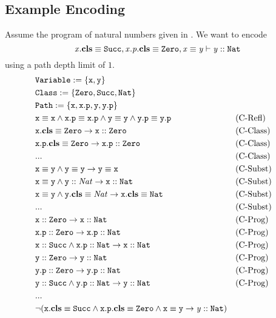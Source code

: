 \documentclass[a4paper]{article}
\begin{document}
\newpage
%
\subsection{Example Encoding}
Assume the program of natural numbers given in .
We want to encode
\[ \mathit{x}.\textbf{cls} \equiv \mathit{\mathtt{Succ}}, \mathit{x.p}.\textbf{cls} \equiv \mathit{\mathtt{Zero}}, \mathit{x} \equiv \mathit{y} \vdash \mathit{y} :: \mathit{\mathtt{Nat}} \]
using a path depth limit of $1$.
\setcounter{equation}{0}
\begin{align}
  &\texttt{\ensuremath{\mathtt{Variable}}} := \{\mathtt{x}, \mathtt{y}\}\\
  &\texttt{\ensuremath{\mathtt{Class}}} := \{\mathtt{Zero},\mathtt{Succ},\mathtt{Nat}\}\\
  &\texttt{\ensuremath{\mathtt{Path}}} := \{\mathtt{x}, \mathtt{x.p}, \mathtt{y}, \mathtt{y.p}\}\\
  &\mathit{\mathtt{x}} \equiv \mathit{\mathtt{x}} \land
  \mathit{\mathtt{x.p}} \equiv \mathit{\mathtt{x.p}} \land
  \mathit{\mathtt{y}} \equiv \mathit{\mathtt{y}} \land
  \mathit{\mathtt{y.p}} \equiv \mathit{\mathtt{y.p}} && \text{(C-Refl)}\\
  &\mathit{\mathtt{x}}.\textbf{cls} \equiv \mathit{\mathtt{Zero}} \rightarrow \mathit{\mathtt{x}} :: \mathit{\mathtt{Zero}} && \text{(C-Class)}\\
  &\mathit{\mathtt{x.p}}.\textbf{cls} \equiv \mathit{\mathtt{Zero}} \rightarrow \mathit{\mathtt{x.p}} :: \mathit{\mathtt{Zero}} && \text{(C-Class)}\\
  & ...  && \text{(C-Class)}\\
  & \mathit{\mathtt{x}} \equiv \mathit{\mathtt{y}} \land \mathit{\mathtt{y}} \equiv \mathit{\mathtt{y}} \rightarrow \mathit{\mathtt{y}} \equiv \mathit{\mathtt{x}} && \text{(C-Subst)}\\
  & \mathit{\mathtt{x}} \equiv \mathit{\mathtt{y}} \land \mathit{\mathtt{y}} :: \mathit{Nat} \rightarrow \mathit{\mathtt{x}} :: \mathit{\mathtt{Nat}} && \text{(C-Subst)}\\
  & \mathit{\mathtt{x}} \equiv \mathit{\mathtt{y}} \land \mathit{\mathtt{y}}.\textbf{cls} \equiv \mathit{Nat} \rightarrow \mathit{\mathtt{x}}.\textbf{cls} \equiv \mathit{\mathtt{Nat}} && \text{(C-Subst)}\\
  & ... && \text{(C-Subst)}\\
  &\mathit{\mathtt{x}} :: \mathit{\mathtt{Zero}} \rightarrow \mathit{\mathtt{x}} :: \mathit{\mathtt{Nat}} && \text{(C-Prog)}\\
  &\mathit{\mathtt{x.p}} :: \mathit{\mathtt{Zero}} \rightarrow \mathit{\mathtt{x.p}} :: \mathit{\mathtt{Nat}} && \text{(C-Prog)}\\
  &\mathit{\mathtt{x}} :: \mathit{\mathtt{Succ}} \land \mathit{\mathtt{x.p}} :: \mathit{\mathtt{Nat}} \rightarrow \mathit{\mathtt{x}} :: \mathit{\mathtt{Nat}} && \text{(C-Prog)}\\
  &\mathit{\mathtt{y}} :: \mathit{\mathtt{Zero}} \rightarrow \mathit{\mathtt{y}} :: \mathit{\mathtt{Nat}} && \text{(C-Prog)}\\
  &\mathit{\mathtt{y.p}} :: \mathit{\mathtt{Zero}} \rightarrow \mathit{\mathtt{y.p}} :: \mathit{\mathtt{Nat}} && \text{(C-Prog)}\\
  &\mathit{\mathtt{y}} :: \mathit{\mathtt{Succ}} \land \mathit{\mathtt{y.p}} :: \mathit{\mathtt{Nat}} \rightarrow \mathit{\mathtt{y}} :: \mathit{\mathtt{Nat}} && \text{(C-Prog)}\\
  &...\\
  &\neg (\mathit{\mathtt{x}}.\textbf{cls} \equiv \mathit{\mathtt{Succ}} \land
        \mathit{\mathtt{x.p}}.\textbf{cls} \equiv \mathit{\mathtt{Zero}} \land
        \mathit{\mathtt{x}} \equiv \mathit{\mathtt{y}} \rightarrow
          \mathit{y} :: \mathit{\mathtt{Nat}})
\end{align}
\end{document}
